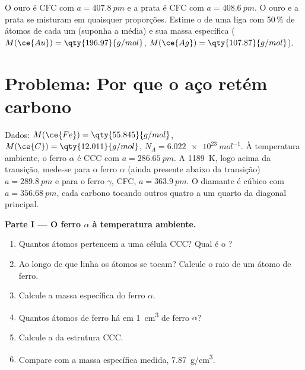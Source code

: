 \begin{exercise}[$\star\star\star$]\label{exo:b1:crystals-metals:12}
O ouro é CFC com $a = \qty{407.8}{pm}$ e a prata é CFC com
$a = \qty{408.6}{pm}$. O ouro e a prata se misturam em quaisquer
proporções. Estime o  de uma liga com 50\,\% de átomos
de cada um (suponha a média) e sua massa específica ($M(\ce{Au}) = \qty{196.97}{g/mol}$,
$M(\ce{Ag}) = \qty{107.87}{g/mol}$).
\end{exercise}

\section{Problema: Por que o aço retém carbono}

\begin{problem}
\label{pb:b1:crystals-metals:1}
Dados: $M(\ce{Fe}) = \qty{55.845}{g/mol}$, $M(\ce{C}) = \qty{12.011}{g/mol}$,
$N_A = \qty{6.022e23}{mol^{-1}}$. À temperatura ambiente, o ferro
$\alpha$ é CCC com $a = \qty{286.65}{pm}$. A \qty{1189}{K}, logo acima da
transição, mede-se para o ferro $\alpha$ (ainda presente abaixo da
transição) $a = \qty{289.8}{pm}$ e para o ferro $\gamma$, CFC,
$a = \qty{363.9}{pm}$. O diamante é cúbico com $a = \qty{356.68}{pm}$,
cada carbono tocando outros quatro a um quarto da diagonal principal.

\medskip
\noindent\textbf{Parte I --- O ferro $\alpha$ à temperatura ambiente.}
\begin{enumerate}
  \item Quantos átomos pertencem a uma célula CCC? Qual é o ?
  \item Ao longo de que linha os átomos se tocam? Calcule o raio de um
        átomo de ferro.
  \item Calcule a massa específica do ferro $\alpha$.
  \item Quantos átomos de ferro há em \qty{1}{cm^3} de ferro $\alpha$?
  \item Calcule a  da estrutura CCC.
  \item Compare com a massa específica medida, \qty{7.87}{g/cm^3}.
\end{enumerate}


\end{problem}
